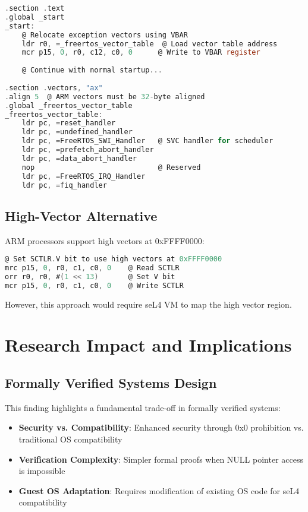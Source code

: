 \documentclass[11pt,a4paper]{article}
\begin{document}
\begin{lstlisting}[language=C,caption=VBAR-Based Vector Table Relocation]
.section .text
.global _start
_start:
    @ Relocate exception vectors using VBAR
    ldr r0, =_freertos_vector_table  @ Load vector table address
    mcr p15, 0, r0, c12, c0, 0      @ Write to VBAR register
    
    @ Continue with normal startup...
    
.section .vectors, "ax"
.align 5  @ ARM vectors must be 32-byte aligned
.global _freertos_vector_table
_freertos_vector_table:
    ldr pc, =reset_handler
    ldr pc, =undefined_handler
    ldr pc, =FreeRTOS_SWI_Handler   @ SVC handler for scheduler
    ldr pc, =prefetch_abort_handler
    ldr pc, =data_abort_handler
    nop                             @ Reserved
    ldr pc, =FreeRTOS_IRQ_Handler
    ldr pc, =fiq_handler
\end{lstlisting}

\subsection{High-Vector Alternative}

ARM processors support high vectors at 0xFFFF0000:

\begin{lstlisting}[language=C,caption=High Vector Configuration]
@ Set SCTLR.V bit to use high vectors at 0xFFFF0000
mrc p15, 0, r0, c1, c0, 0    @ Read SCTLR
orr r0, r0, #(1 << 13)       @ Set V bit
mcr p15, 0, r0, c1, c0, 0    @ Write SCTLR
\end{lstlisting}

However, this approach would require seL4 VM to map the high vector region.

\section{Research Impact and Implications}

\subsection{Formally Verified Systems Design}

This finding highlights a fundamental trade-off in formally verified systems:

\begin{itemize}
    \item \textbf{Security vs. Compatibility}: Enhanced security through 0x0 prohibition vs. traditional OS compatibility
    \item \textbf{Verification Complexity}: Simpler formal proofs when NULL pointer access is impossible
    \item \textbf{Guest OS Adaptation}: Requires modification of existing OS code for seL4 compatibility
\end{itemize}
\end{document}
